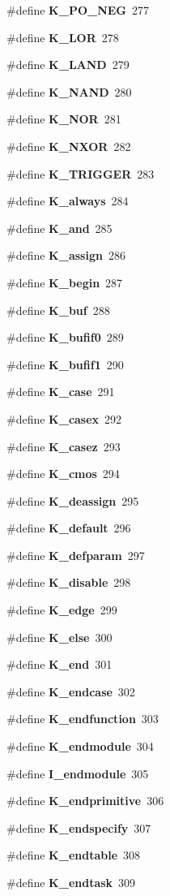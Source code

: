 \begin{CompactItemize}
\#define {\bf K\_\-PO\_\-NEG}\ 277
\item 
\#define {\bf K\_\-LOR}\ 278
\item 
\#define {\bf K\_\-LAND}\ 279
\item 
\#define {\bf K\_\-NAND}\ 280
\item 
\#define {\bf K\_\-NOR}\ 281
\item 
\#define {\bf K\_\-NXOR}\ 282
\item 
\#define {\bf K\_\-TRIGGER}\ 283
\item 
\#define {\bf K\_\-always}\ 284
\item 
\#define {\bf K\_\-and}\ 285
\item 
\#define {\bf K\_\-assign}\ 286
\item 
\#define {\bf K\_\-begin}\ 287
\item 
\#define {\bf K\_\-buf}\ 288
\item 
\#define {\bf K\_\-bufif0}\ 289
\item 
\#define {\bf K\_\-bufif1}\ 290
\item 
\#define {\bf K\_\-case}\ 291
\item 
\#define {\bf K\_\-casex}\ 292
\item 
\#define {\bf K\_\-casez}\ 293
\item 
\#define {\bf K\_\-cmos}\ 294
\item 
\#define {\bf K\_\-deassign}\ 295
\item 
\#define {\bf K\_\-default}\ 296
\item 
\#define {\bf K\_\-defparam}\ 297
\item 
\#define {\bf K\_\-disable}\ 298
\item 
\#define {\bf K\_\-edge}\ 299
\item 
\#define {\bf K\_\-else}\ 300
\item 
\#define {\bf K\_\-end}\ 301
\item 
\#define {\bf K\_\-endcase}\ 302
\item 
\#define {\bf K\_\-endfunction}\ 303
\item 
\#define {\bf K\_\-endmodule}\ 304
\item 
\#define {\bf I\_\-endmodule}\ 305
\item 
\#define {\bf K\_\-endprimitive}\ 306
\item 
\#define {\bf K\_\-endspecify}\ 307
\item 
\#define {\bf K\_\-endtable}\ 308
\item 
\#define {\bf K\_\-endtask}\ 309
\item 

\end{CompactItemize}
